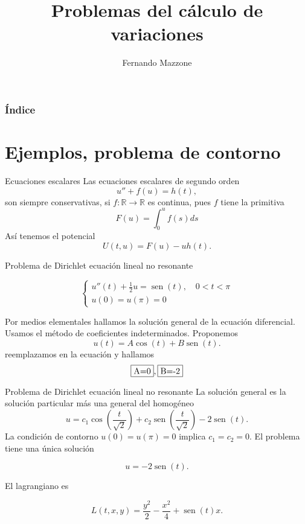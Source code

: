 \documentclass[handout,hyperref={colorlinks=true}]{beamer}
\title[Cálculo de variaciones] %
{%
Problemas del cálculo de variaciones
}
\author[] %
{Fernando Mazzone}
\institute[Depto de Matemática] %
{
 Dpto de Matemática\\
Facultad de Ciencias Exactas Físico-Químicas y Naturales\\
Universidad Nacional de Río Cuarto
 Dpto de Matemática\\
Facultad de Ciencias Exactas y Naturales\\
Universidad Nacional de La Pampa\\
CONICET}
\newcommand{\rr}{\mathbb{R}}
\DeclareMathOperator{\sen}{sen}
\begin{document}
\begin{frame}
    \frametitle{Índice}
\tableofcontents

\end{frame}

\section{Ejemplos, problema de contorno}
\begin{frame}{Ecuaciones escalares}
   Las ecuaciones escalares de segundo orden
\[u''+f(u)=h(t),\]
son siempre conservativas, si $f:\rr\to\rr$ es continua, pues $f$ tiene la primitiva
\[F(u)=\int_0^uf(s)ds\] 
Así tenemos el potencial
\[U(t,u)=F(u)-uh(t).\]
\end{frame}





\begin{frame}{Problema de Dirichlet ecuación lineal  no resonante}

\[\left\{ \begin{array}{l}
            u''(t)+\frac12 u=\sen(t),\quad 0<t<\pi\\
            u(0)=u(\pi)=0
          \end{array}
          \right.
\]

Por medios elementales hallamos la solución general de la ecuación diferencial. Usamos el método de coeficientes indeterminados. Proponemos 
\[u(t)=A\cos(t)+B\sen(t).\]
reemplazamos en la ecuación y hallamos
\[\fbox{A=0}, \fbox{B=-2}\]


\end{frame}





\begin{frame}{Problema de Dirichlet ecuación lineal  no resonante}
La solución general es la solución particular más una general del homogéneo
\[u=c_1\cos\left(\frac{t}{\sqrt{2}}\right)+c_2\sen\left(\frac{t}{\sqrt{2}}\right)-2\sen(t).\]
La condición de contorno $ u(0)=u(\pi)=0$ implica $c_1=c_2=0$. El problema tiene una única solución

\[\boxed{u=-2\sen(t).}\]

El lagrangiano es

\[L(t,x,y)=\frac{y^2}{2}-\frac{x^2}{4}+\sen(t) x.\]
\end{frame}
\end{document}
